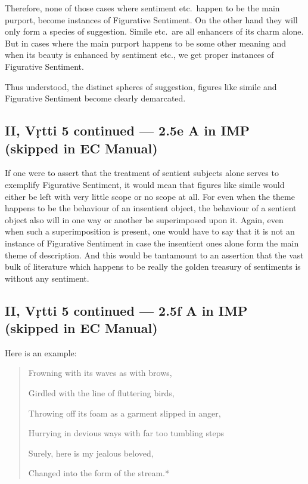 \documentclass[12pt]{book}
\begin{document}
Therefore, none of those cases where sentiment etc.\ happen
to be the main purport, become instances of Figurative Sentiment.
On the other hand they will only form a species of suggestion.
Simile etc.\ are all enhancers of its charm alone. But in cases
where the main purport happens to be some other meaning and
when its beauty is enhanced by sentiment etc., we get proper
instances of Figurative Sentiment.

Thus understood, the distinct spheres of suggestion, figures
like simile and Figurative Sentiment become clearly demarcated.


\subsection{II, Vṛtti 5 continued --- 2.5e A in IMP (skipped in EC Manual)}

If one were to assert that the treatment of sentient subjects
alone serves to exemplify Figurative Sentiment, it would mean
that figures like simile would either be left with very little scope
or no scope at all. For even when the theme happens to be
the behaviour of an insentient object, the behaviour of a sentient
object also will in one way or another be superimposed upon
it. Again, even when such a superimposition is present, one
would have to say that it is not an instance of Figurative
Sentiment in case the insentient ones alone form the main theme
of description. And this would be tantamount to an assertion
that the vast bulk of literature which happens to be really the
golden treasury of sentiments is without any sentiment. 


\subsection{II, Vṛtti 5 continued --- 2.5f A in IMP (skipped in EC Manual)}

Here
is an example:

\begin{quotation}
\begin{em}
Frowning with its waves as with brows,

Girdled with the line of fluttering birds,

Throwing off its foam as a garment slipped in anger,

Hurrying in devious ways with far too tumbling steps

Surely, here is my jealous beloved,

Changed into the form of the stream.*
\end{em}
\end{quotation}
\end{document}
